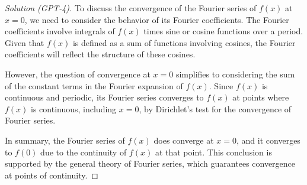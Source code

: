 \documentclass[11pt]{article}
\numberwithin{equation}{section}
\begin{document}
\begin{proof}[Solution (GPT-4)]
  To discuss the convergence of the Fourier series of \(f(x)\) at \(x = 0\), we need to consider the behavior of its Fourier coefficients. The Fourier coefficients involve integrals of \(f(x)\) times sine or cosine functions over a period. Given that \(f(x)\) is defined as a sum of functions involving cosines, the Fourier coefficients will reflect the structure of these cosines.
  
  However, the question of convergence at \(x = 0\) simplifies to considering the sum of the constant terms in the Fourier expansion of \(f(x)\). Since \(f(x)\) is continuous and periodic, its Fourier series converges to \(f(x)\) at points where \(f(x)\) is continuous, including \(x = 0\), by Dirichlet's test for the convergence of Fourier series.
  
  In summary, the Fourier series of \(f(x)\) does converge at \(x = 0\), and it converges to \(f(0)\) due to the continuity of \(f(x)\) at that point. This conclusion is supported by the general theory of Fourier series, which guarantees convergence at points of continuity.
\end{proof}
\end{document}
